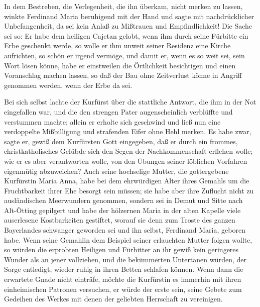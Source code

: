 In dem Bestreben, die Verlegenheit, die ihn überkam, nicht merken
zu lassen, winkte Ferdinand Maria beruhigend mit der Hand und sagte
mit nachdrücklicher Unbefangenheit, da sei kein Anlaß zu Mißtrauen
und Empfindlichkeit! Die Sache sei so: Er habe dem heiligen Cajetan
gelobt, wenn ihm durch seine Fürbitte ein Erbe geschenkt werde, so
wolle er ihm unweit seiner Residenz eine Kirche aufrichten, so
schön er irgend vermöge, und damit er, wenn es so weit sei, sein
Wort lösen könne, habe er einstweilen die Örtlichkeit besichtigen
und einen Voranschlag machen lassen, so daß der Bau ohne
Zeitverlust könne in Angriff genommen werden, wenn der Erbe da
sei.

Bei sich selbst lachte der Kurfürst über die stattliche Antwort,
die ihm in der Not eingefallen war, und die den strengen Pater
augenscheinlich verblüffte und verstummen machte; allein er erholte
sich geschwind und ließ nun eine verdoppelte Mißbilligung und
strafenden Eifer ohne Hehl merken. Es habe zwar, sagte er, gewiß
dem Kurfürsten Gott eingegeben, daß er durch ein frommes,
christkatholisches Gelübde sich den Segen der Nachkommenschaft
erflehen wolle; wie er es aber verantworten wolle, von den Übungen
seiner löblichen Vorfahren eigenmütig\pagenum{[105]} abzuweichen?
Auch seine hochselige Mutter, die gottergebene Kurfürstin Maria
Anna, habe bei dem ehrwürdigen Alter ihres Gemahls um die
Fruchtbarkeit ihrer Ehe besorgt sein müssen; sie habe aber ihre
Zuflucht nicht zu ausländischen Meerwundern genommen, sondern sei
in Demut und Sitte nach Alt-Ötting gepilgert und habe der hölzernen
Maria in der alten Kapelle viele auserlesene Kostbarkeiten
gestiftet, worauf sie denn zum Troste des ganzen Bayerlandes
schwanger geworden sei und ihn selbst, Ferdinand Maria, geboren
habe. Wenn seine Gemahlin dem Beispiel seiner erlauchten Mutter
folgen wollte, so würden die erprobten Heiligen und Fürbitter an
ihr gewiß kein geringeres Wunder als an jener vollziehen, und die
bekümmerten Untertanen würden, der Sorge entledigt, wieder ruhig in
ihren Betten schlafen können. Wenn dann die erwartete Gnade nicht
einträfe, möchte die Kurfürstin es immerhin mit ihren einheimischen
Patronen versuchen, er würde der erste sein, seine Gebete zum
Gedeihen des Werkes mit denen der geliebten Herrschaft zu
vereinigen.

